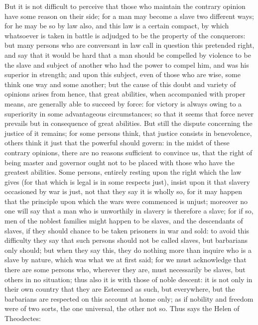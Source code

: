 But it is not difficult to perceive that those who maintain the contrary
opinion have some reason on their side; for a man may become a slave two
different ways; for he may be so by law also, and this law is a certain
compact, by which whatsoever is taken in battle is adjudged to be the
property of the conquerors: but many persons who are conversant in law
call in question this pretended right, and say that it would be hard that
a man should be compelled by violence to be the slave and subject of
another who had the power to compel him, and was his superior in strength;
and upon this subject, even of those who are wise, some think one way and
some another; but the cause of this doubt and variety of opinions arises
from hence, that great abilities, when accompanied with proper means, are
generally able to succeed by force: for victory is always owing to a
superiority in some advantageous circumstances; so that it seems that
force never prevails but in consequence of great abilities. But still the
dispute concerning the justice of it remains; for some persons think, that
justice consists in benevolence, others think it just that the powerful
should govern: in the midst of these contrary opinions, there are no
reasons sufficient to convince us, that the right of being master and
governor ought not to be placed with those who have the greatest
abilities. Some persons, entirely resting upon the right which the law
gives (for that which is legal is in some respects just), insist upon it
that slavery occasioned by war is just, not that they say it is wholly so,
for it may happen that the principle upon which the wars were commenced is
unjust; moreover no one will say that a man who is unworthily in slavery
is therefore a slave; for if so, men of the noblest families might happen
to be slaves, and the descendants of slaves, if they should chance to be
taken prisoners in war and sold: to avoid this difficulty they say that
such persons should not be called slaves, but barbarians only should; but
when they say this, they do nothing more than inquire who is a slave by
nature, which was what we at first said; for we must acknowledge that
there are some persons who, wherever they are, must necessarily be slaves,
but others in no situation; thus also it is with those of noble descent:
it is not only in their own country that they are Esteemed as such, but
everywhere, but the barbarians are respected on this account at home only;
as if nobility and freedom were of two sorts, the one universal, the other
not so. Thus says the Helen of Theodectes:

